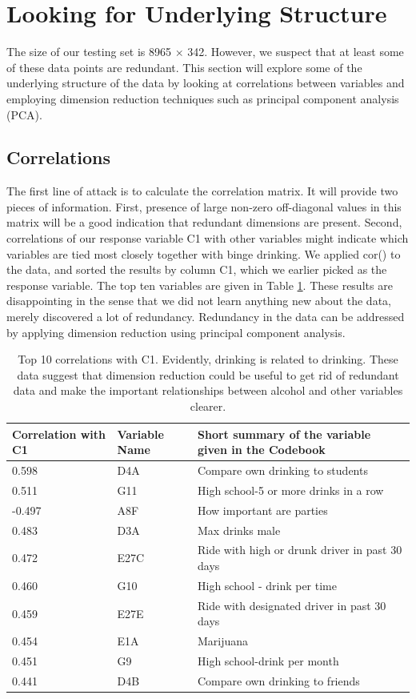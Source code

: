\section{Looking for Underlying Structure}
\label{sec:PCA}
The size of our testing set is 8965 $\times$ 342. However, we suspect that at least some of these data points are redundant. This section will explore some of the underlying structure of the data by looking at correlations between variables and employing dimension reduction techniques such as principal component analysis (PCA). 
\subsection{Correlations}
The first line of attack is to calculate the correlation matrix. It will provide two pieces of information. First, presence of large non-zero off-diagonal values in this matrix will be a good indication that redundant dimensions are present. Second, correlations of our response variable C1 with other variables might indicate which variables are tied most closely together with binge drinking. We applied cor() to the data, and sorted the results by column C1, which we earlier picked as the response variable. The top ten variables are given in Table \ref{correlations}. These results are disappointing in the sense that we did not learn anything new about the data, merely discovered a lot of redundancy. Redundancy in the data can be addressed by applying dimension reduction using principal component analysis.

\begin{center}
\begin{table}[ht]
\centering
\begin{tabular}{l l l}
\hline \hline
Correlation with C1 & Variable Name &Short summary of the variable given in the Codebook\\ \hline 
0.598 & D4A	&Compare own drinking to students\\
0.511 & G11	&High school-5 or more drinks in a row\\
-0.497 & A8F	&How important are parties\\
0.483 & D3A	&Max drinks male\\
0.472 & E27C	&Ride with high or drunk driver in past 30 days\\
0.460 & G10	&High school - drink per time\\
0.459 & E27E	&Ride with designated driver in past 30 days\\
0.454 & E1A	&Marijuana\\
0.451 & G9	&High school-drink per month\\
0.441 & D4B	&Compare own drinking to friends\\
\hline
\end{tabular}
\caption{Top 10 correlations with C1. Evidently, drinking is related to drinking. These data suggest that dimension reduction could be useful to get rid of redundant data and make the important relationships between alcohol and other variables clearer.}
\label{correlations}
\end{table}
\end{center}

